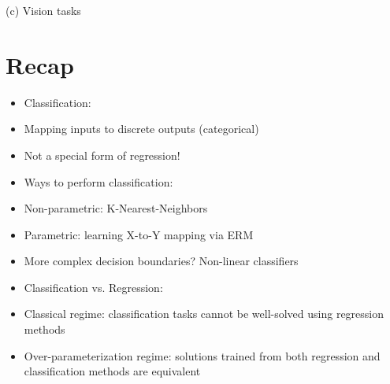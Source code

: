 \documentclass[10pt]{article}
\begin{document}
(c) Vision tasks

\section*{Recap}
\begin{itemize}
  \item Classification:

  \item Mapping inputs to discrete outputs (categorical)

  \item Not a special form of regression!

  \item Ways to perform classification:

  \item Non-parametric: K-Nearest-Neighbors

  \item Parametric: learning X-to-Y mapping via ERM

  \item More complex decision boundaries? Non-linear classifiers

  \item Classification vs. Regression:

  \item Classical regime: classification tasks cannot be well-solved using regression methods

  \item Over-parameterization regime: solutions trained from both regression and classification methods are equivalent

\end{itemize}
\end{document}
